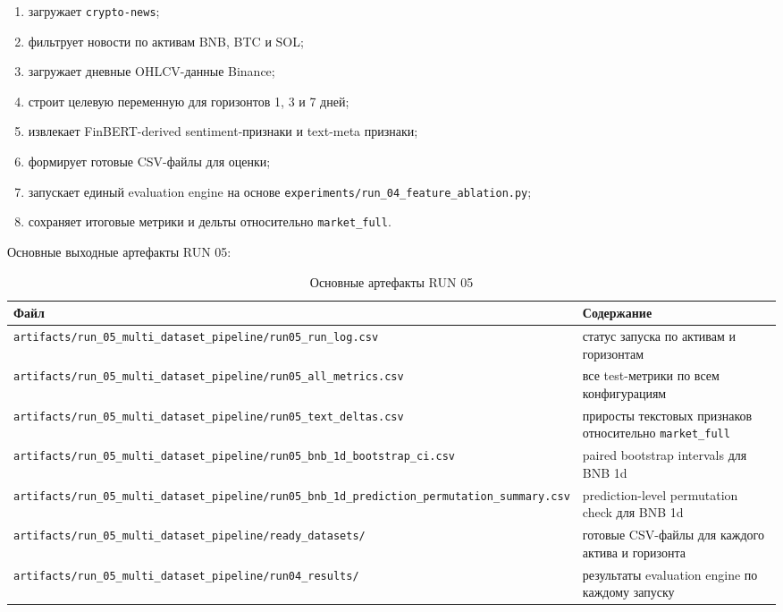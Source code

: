 \begin{enumerate}
    \item загружает \texttt{crypto-news};
    \item фильтрует новости по активам BNB, BTC и SOL;
    \item загружает дневные OHLCV-данные Binance;
    \item строит целевую переменную для горизонтов 1, 3 и 7 дней;
    \item извлекает FinBERT-derived sentiment-признаки и text-meta признаки;
    \item формирует готовые CSV-файлы для оценки;
    \item запускает единый evaluation engine на основе \texttt{experiments/run\_04\_feature\_ablation.py};
    \item сохраняет итоговые метрики и дельты относительно \texttt{market\_full}.
\end{enumerate}

Основные выходные артефакты RUN 05:

\begin{table}[htbp]
\centering
\begin{tabular}{ll}
\toprule
Файл & Содержание \\
\midrule
\texttt{artifacts/run\_05\_multi\_dataset\_pipeline/run05\_run\_log.csv} & статус запуска по активам и горизонтам \\
\texttt{artifacts/run\_05\_multi\_dataset\_pipeline/run05\_all\_metrics.csv} & все test-метрики по всем конфигурациям \\
\texttt{artifacts/run\_05\_multi\_dataset\_pipeline/run05\_text\_deltas.csv} & приросты текстовых признаков относительно \texttt{market\_full} \\
\texttt{artifacts/run\_05\_multi\_dataset\_pipeline/run05\_bnb\_1d\_bootstrap\_ci.csv} & paired bootstrap intervals для BNB 1d \\
\texttt{artifacts/run\_05\_multi\_dataset\_pipeline/run05\_bnb\_1d\_prediction\_permutation\_summary.csv} & prediction-level permutation check для BNB 1d \\
\texttt{artifacts/run\_05\_multi\_dataset\_pipeline/ready\_datasets/} & готовые CSV-файлы для каждого актива и горизонта \\
\texttt{artifacts/run\_05\_multi\_dataset\_pipeline/run04\_results/} & результаты evaluation engine по каждому запуску \\
\bottomrule
\end{tabular}
\caption{Основные артефакты RUN 05}
\label{tab:appendix_run05_artifacts}
\end{table}

